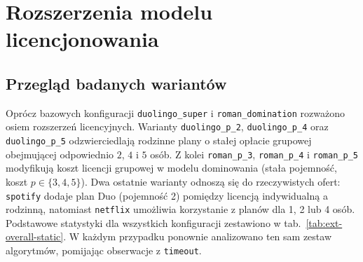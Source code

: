 \chapter{Rozszerzenia modelu licencjonowania}\label{chap:extensions}

\section{Przegląd badanych wariantów}

Oprócz bazowych konfiguracji \texttt{duolingo\_super} i \texttt{roman\_domination} rozważono osiem rozszerzeń licencyjnych. Warianty \texttt{duolingo\_p\_2}, \texttt{duolingo\_p\_4} oraz \texttt{duolingo\_p\_5} odzwierciedlają rodzinne plany o stałej opłacie grupowej obejmującej odpowiednio $2$, $4$ i $5$ osób. Z kolei \texttt{roman\_p\_3}, \texttt{roman\_p\_4} i \texttt{roman\_p\_5} modyfikują koszt licencji grupowej w modelu dominowania (stała pojemność, koszt $p \in \{3,4,5\}$). Dwa ostatnie warianty odnoszą się do rzeczywistych ofert: \texttt{spotify} dodaje plan Duo (pojemność 2) pomiędzy licencją indywidualną a rodzinną, natomiast \texttt{netflix} umożliwia korzystanie z planów dla 1, 2 lub 4 osób. Podstawowe statystyki dla wszystkich konfiguracji zestawiono w tab.~\ref{tab:ext-overall-static}. W każdym przypadku ponownie analizowano ten sam zestaw algorytmów, pomijając obserwacje z \texttt{timeout}.

